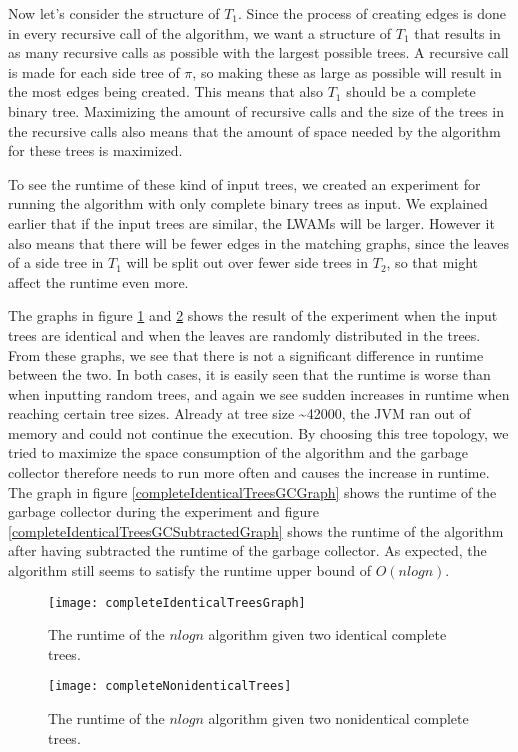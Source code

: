 Now let's consider the structure of $T_1$. Since the process of creating edges is done in every recursive call of the algorithm, we want a structure of $T_1$ that results in as many recursive calls as possible with the largest possible trees. A recursive call is made for each side tree of $\pi$, so making these as large as possible will result in the most edges being created. This means that also $T_1$ should be a complete binary tree. Maximizing the amount of recursive calls and the size of the trees in the recursive calls also means that the amount of space needed by the algorithm for these trees is maximized.

To see the runtime of these kind of input trees, we created an experiment for running the algorithm with only complete binary trees as input. We explained earlier that if the input trees are similar, the LWAMs will be larger. However it also means that there will be fewer edges in the matching graphs, since the leaves of a side tree in $T_1$ will be split out over fewer side trees in $T_2$, so that might affect the runtime even more.

The graphs in figure \ref{completeIdenticalTreesGraph} and \ref{completeNonidenticalTreesGraph} shows the result of the experiment when the input trees are identical and when the leaves are randomly distributed in the trees. From these graphs, we see that there is not a significant difference in runtime between the two. In both cases, it is easily seen that the runtime is worse than when inputting random trees, and again we see sudden increases in runtime when reaching certain tree sizes. Already at tree size \textasciitilde 42000, the JVM ran out of memory and could not continue the execution. 
By choosing this tree topology, we tried to maximize the space consumption of the algorithm and the garbage collector therefore needs to run more often and causes the increase in runtime. The graph in figure \ref{completeIdenticalTreesGCGraph} shows the runtime of the garbage collector during the experiment and figure \ref{completeIdenticalTreesGCSubtractedGraph} shows the runtime of the algorithm after having subtracted the runtime of the garbage collector. As expected, the algorithm still seems to satisfy the runtime upper bound of $O(nlogn)$.

\begin{figure}
	\texttt{[image: completeIdenticalTreesGraph]}
	\caption{The runtime of the $nlogn$ algorithm given two identical complete trees.}
	\label{completeIdenticalTreesGraph}
\end{figure}
\begin{figure}
	\texttt{[image: completeNonidenticalTrees]}
	\caption{The runtime of the $nlogn$ algorithm given two nonidentical complete trees.}
	\label{completeNonidenticalTreesGraph}
\end{figure}

